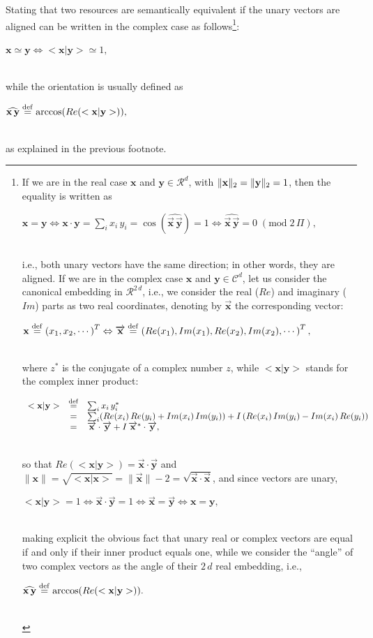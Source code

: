 \documentclass[sn-mathphys]{sn-jnl}
\newcommand{\defq}{\stackrel {\rm def}{=}}
\newcommand{\eqline}[1]{~\vspace{0.1cm}\\\centerline{$#1$}\vspace{0.1cm}\\}
\begin{document}
\begin{appendices}
Stating that two resources are semantically equivalent if the unary vectors are aligned can be written in the complex case as follows\footnote{If we are in the real case $\mathbf{x}$ and $\mathbf{y} \in {\mathcal R}^d$, with $\|{\bf x}\|_2 = \|{\bf y}\|_2 = 1$, then the equality is written as \eqline{\mathbf{x} = \mathbf{y} \Leftrightarrow \mathbf{x} \cdot \mathbf{y} = \sum_i x_i \, y_i = \cos\left(\widehat{\overrightarrow{\mathbf{x}} \, \overrightarrow{\mathbf{y}}}\right) = 1 \Leftrightarrow \widehat{\overrightarrow{\mathbf{x}} \, \overrightarrow{\mathbf{y}}} = 0 \; (\mbox{mod} \; 2 \, \Pi),}
i.e., both unary vectors have the same direction; in other words, they are aligned.
If we are in the complex case $\mathbf{x}$ and $\mathbf{y} \in {\mathcal C}^d$, let us consider the canonical embedding in ${\mathcal R}^{2\,d}$, i.e., we consider the real ($Re$) and imaginary ($Im$) parts as two real coordinates, denoting by $\overrightarrow{\mathbf{x}}$ the corresponding vector:
\eqline{\mathbf{x} \defq \left(x_1, x_2, \cdots \right)^T \Leftrightarrow \overrightarrow{\mathbf{x}} \defq \left(Re(x_1), Im(x_1), Re(x_2), Im(x_2), \cdots\right)^T,}
where $z^*$ is the conjugate of a complex number $z$, while $<\mathbf{x} \vert \mathbf{y}>$ stands for the complex inner product:
\eqline{\begin{array}{rcl}<\mathbf{x} \vert \mathbf{y}> 
&\defq& \sum_i x_i \, y_i^* \\
&=& \sum_i 
  (Re(x_i) \, Re(y_i) + Im(x_i) \, Im(y_i)) + I \, (Re(x_i) \, Im(y_i) - Im(x_i) \, Re(y_i)) \\
&=&
  \overrightarrow{\mathbf{x}} \cdot \overrightarrow{\mathbf{y}} + I \, 
  \overrightarrow{\mathbf{x}}^* \cdot \overrightarrow{\mathbf{y}},
\end{array}}
so that $Re(<\mathbf{x} \vert \mathbf{y}>) = \overrightarrow{\mathbf{x}} \cdot \overrightarrow{\mathbf{y}}$ and $\|\mathbf{x}\| = \sqrt{<\mathbf{x} \vert \mathbf{x}>} = \|\overrightarrow{\mathbf{x}}\|-2 = \sqrt{\overrightarrow{\mathbf{x}} \cdot \overrightarrow{\mathbf{x}}}$, and since vectors are unary, 
\eqline{<\mathbf{x} \vert \mathbf{y}> = 1 \Leftrightarrow \overrightarrow{\mathbf{x}} \cdot \overrightarrow{\mathbf{y}} = 1 \Leftrightarrow \overrightarrow{\mathbf{x}} = \overrightarrow{\mathbf{y}} \Leftrightarrow \mathbf{x} = \mathbf{y},}
making explicit the obvious fact that unary real or complex vectors are equal if and only if their inner product equals one, while we consider the ``angle'' of two complex vectors as the angle of their $2\,d$ real embedding, i.e.,
\eqline{\widehat{\mathbf{x} \, \mathbf{y}} \defq \mbox{arccos}(Re(<\mathbf{x} \vert \mathbf{y}>)).}}: 
\eqline{\mathbf{x} \simeq \mathbf{y} \Leftrightarrow <\mathbf{x} \vert \mathbf{y}> \simeq 1,
} while the orientation is usually defined as
\eqline{\widehat{\mathbf{x} \, \mathbf{y}} \defq \mbox{arccos}(Re(<\mathbf{x} \vert \mathbf{y}>)),}
as explained in the previous footnote.


\end{appendices}
\end{document}
